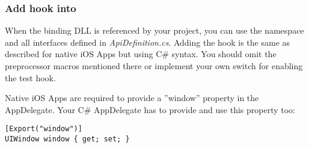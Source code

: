 \subsubsection{Add hook into \gdaut{}}
When the binding DLL is referenced by your project, you can use the namespace and all interfaces defined in \emph{ApiDefinition.cs}.
Adding the hook is the same as described for native iOS Apps but using C\# syntax. You should omit the preprocessor macros mentioned there or implement your own switch for enabling the test hook.

Native iOS Apps are required to provide a ''window'' property in the AppDelegate. Your C\# AppDelegate has to provide and use this property too:
\begin{verbatim}
[Export("window")]
UIWindow window { get; set; }
\end{verbatim}
